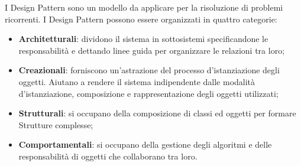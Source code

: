 I \gls{Design Pattern} sono un modello da applicare per la risoluzione di problemi ricorrenti. I \gls{Design Pattern} possono essere organizzati in quattro categorie:
	\begin{itemize}
		\item \textbf{Architetturali}: dividono il sistema in sottosistemi specificandone le responsabilità e dettando linee guida per organizzare le relazioni tra loro;
		\item \textbf{Creazionali}: forniscono un'astrazione del processo d'istanziazione degli oggetti. Aiutano a rendere il sistema indipendente dalle modalità d'istanziazione, composizione e rappresentazione degli oggetti utilizzati;
		\item \textbf{Strutturali}: si occupano della composizione di classi ed oggetti per formare Strutture complesse;
		\item \textbf{Comportamentali}: si occupano della gestione degli algoritmi e delle responsabilità di oggetti che collaborano tra loro.
	\end{itemize}
	
